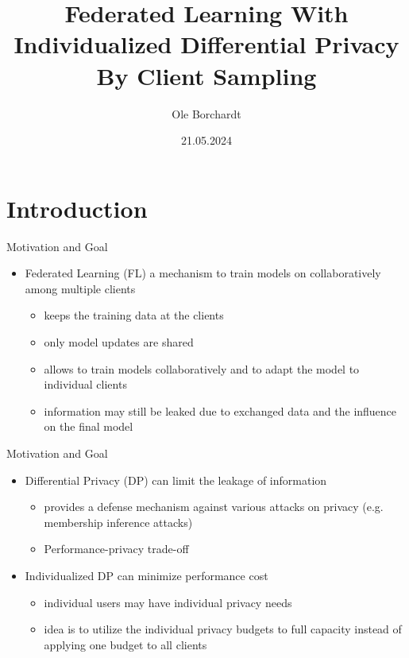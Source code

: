 \documentclass[aspectratio=169]{beamer}
\title{Federated Learning With Individualized Differential Privacy By Client Sampling}
\subtitle{}
\author{Ole Borchardt}
\institute{Leipzig University}
\date{21.05.2024}
\begin{document}
  
\maketitlepage

\begin{frame}
\tableofcontents[hideallsubsections]
\end{frame}

\section{Introduction}

\begin{frame}{Motivation and Goal}
    \begin{itemize}
        \item Federated Learning (FL) a mechanism to train models on collaboratively among multiple clients
        \begin{itemize}
            \item keeps the training data at the clients
            \item only model updates are shared
            \item allows to train models collaboratively and to adapt the model to individual clients
            \item information may still be leaked due to exchanged data and the influence on the final model
        \end{itemize} 
    \end{itemize}
\end{frame}

\begin{frame}{Motivation and Goal}
    \begin{itemize}
        \item Differential Privacy (DP) can limit the leakage of information
        \begin{itemize}
            \item provides a defense mechanism against various attacks on privacy (e.g. membership inference attacks)
            \item Performance-privacy trade-off
        \end{itemize}
        \item<2-> Individualized DP can minimize performance cost
        \begin{itemize}
            \item individual users may have individual privacy needs
            \item idea is to utilize the individual privacy budgets to full capacity instead of applying one budget to all clients
        \end{itemize}
    \end{itemize}
\end{frame}
\end{document}

